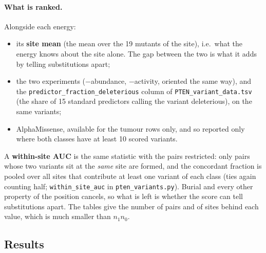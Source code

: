 \documentclass[11pt,a4paper]{article}
\newcommand{\file}[1]{\texttt{#1}}
\begin{document}
\paragraph{What is ranked.} Alongside each energy:
\begin{itemize}
\item its \textbf{site mean} (the mean over the 19 mutants of the site), i.e.\
  what the energy knows about the site alone. The gap between the two is what
  it adds by telling substitutions apart;
\item the two experiments ($-$abundance, $-$activity, oriented the same way),
  and the \texttt{predictor\_fraction\_deleterious} column of
  \file{PTEN\_variant\_data.tsv} (the share of 15 standard predictors calling
  the variant deleterious), on the same variants;
\item AlphaMissense, available for the tumour rows only, and so reported only
  where both classes have at least 10 scored variants.
\end{itemize}
A \textbf{within-site AUC} is the same statistic with the pairs restricted:
only pairs whose two variants sit at the \emph{same} site are formed, and the
concordant fraction is pooled over all sites that contribute at least one
variant of each class (ties again counting half; \texttt{within\_site\_auc} in
\file{pten\_variants.py}). Burial and every other property of the position
cancels, so what is left is whether the score can tell substitutions apart.
The tables give the number of pairs and of sites behind each value, which is
much smaller than $n_1 n_0$.

\subsection{Results}
\end{document}
